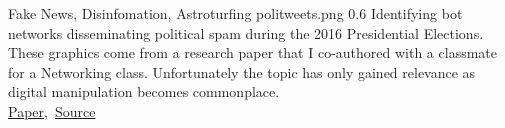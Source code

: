 \cvexample
  {Fake News, Disinfomation, Astroturfing}
  {politweets.png}
  {0.6}
  {%
    Identifying bot networks disseminating political spam during the 2016 Presidential Elections.
    These graphics come from a research paper that I co-authored with a classmate for a Networking class.
    Unfortunately the topic has only gained relevance as digital manipulation becomes commonplace.\\
    \raggedleft\href{https://github.com/ryan-p-larson/polititweets/raw/master/OpinionMachine.pdf}{Paper},\, \href{https://github.com/ryan-p-larson/polititweets}{Source}
}